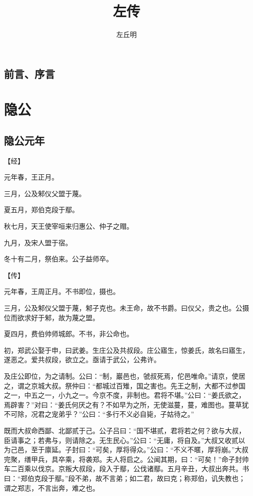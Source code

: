 \documentclass[a4paper,12pt,UTF8,twoside]{ctexbook}
\title{\heiti\zihao{0} 左传}
\author{左丘明}
\date{}
\begin{document}
\maketitle
\tableofcontents

\frontmatter
\chapter{前言、序言}



\mainmatter

\part{隐公}

\chapter{隐公元年}

【经】

元年春，王正月。

三月，公及邾仪父盟于蔑。

夏五月，郑伯克段于鄢。

秋七月，天王使宰咺来归惠公、仲子之赗。

九月，及宋人盟于宿。

冬十有二月，祭伯来。公子益师卒。

【传】

元年春，王周正月。不书即位，摄也。

三月，公及邾仪父盟于蔑，邾子克也。未王命，故不书爵。曰仪父，贵之也。公摄位而欲求好于邾，故为蔑之盟。

夏四月，费伯帅师城郎。不书，非公命也。

初，郑武公娶于申，曰武姜。生庄公及共叔段。庄公寤生，惊姜氏，故名曰寤生，遂恶之。爱共叔段，欲立之。亟请于武公，公弗许。

及庄公即位，为之请制。公曰：“制，巖邑也，虢叔死焉，佗邑唯命。”请京，使居之，谓之京城大叔。祭仲曰：“都城过百雉，国之害也。先王之制，大都不过参国之一，中五之一，小九之一。今京不度，非制也。君将不堪。”公曰：“姜氏欲之，焉辟害？”对曰：“姜氏何厌之有？不如早为之所，无使滋蔓，蔓，难图也。蔓草犹不可除，况君之宠弟乎？”公曰：“多行不义必自毙，子姑待之。”

既而大叔命西鄙、北鄙贰于己。公子吕曰：“国不堪贰，君将若之何？欲与大叔，臣请事之；若弗与，则请除之。无生民心。”公曰：“无庸，将自及。”大叔又收贰以为己邑，至于廪延。子封曰：“可矣，厚将得众。”公曰：“不义不暱，厚将崩。”大叔完聚，缮甲兵，具卒乘，将袭郑。夫人将启之。公闻其期，曰：“可矣！”命子封帅车二百乘以伐京。京叛大叔段，段入于鄢，公伐诸鄢。五月辛丑，大叔出奔共。书曰：“郑伯克段于鄢。”段不弟，故不言弟；如二君，故曰克；称郑伯，讥失教也；谓之郑志，不言出奔，难之也。
\end{document}
